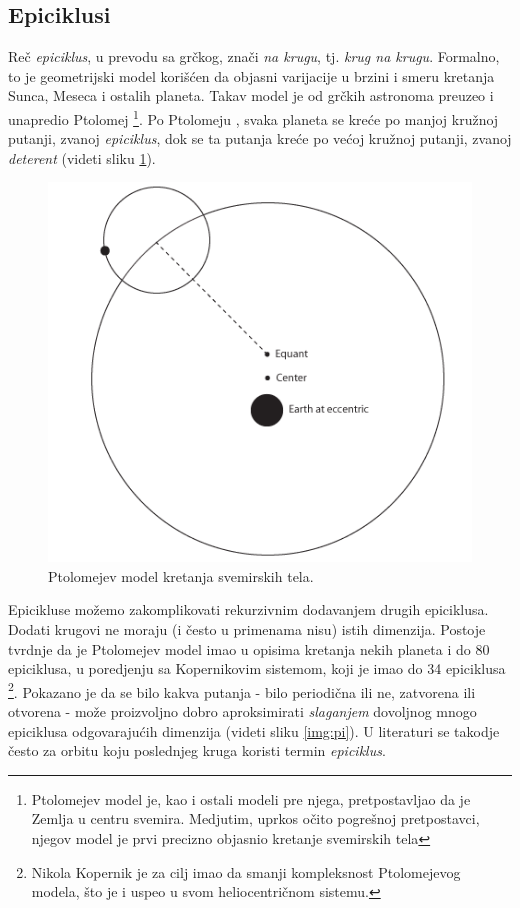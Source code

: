 \subsection{Epiciklusi}
\label{sec:Epicycles}

Re\v{c} \emph{epiciklus}, u prevodu sa gr\v{c}kog, zna\v{c}i \emph{na krugu}, tj. \emph{krug na krugu}. Formalno, to je geometrijski model kori\v{s}\'c{}en da objasni varijacije u brzini i smeru kretanja Sunca, Meseca i ostalih planeta. Takav model je od gr\v{c}kih astronoma preuzeo i unapredio Ptolomej \footnote{Ptolomejev model je, kao i ostali modeli pre njega, pretpostavljao da je Zemlja u centru svemira. Medjutim, uprkos o\v{c}ito pogre\v{s}noj pretpostavci, njegov model je prvi precizno objasnio kretanje svemirskih tela}. Po Ptolomeju \cite{PtolemaicModel}, svaka planeta se kre\'c{}e po manjoj kru\v{z}noj putanji, zvanoj \emph{epiciklus}, dok se ta putanja kre\'c{}e po ve\'c{}oj kru\v{z}noj putanji, zvanoj \emph{deterent} (videti sliku \ref{img:PtolemaicModel}). 

\begin{figure}
    \centering
    \includegraphics[scale=0.5]{images/ptolomaic_model.PNG}
    \caption{Ptolomejev model kretanja svemirskih tela.}
    \label{img:PtolemaicModel}
\end{figure}

Epicikluse mo\v{z}emo zakomplikovati rekurzivnim dodavanjem drugih epiciklusa. Dodati krugovi ne moraju (i \v{c}esto u primenama nisu) istih dimenzija. Postoje tvrdnje da je Ptolomejev model imao u opisima kretanja nekih planeta i do 80 epiciklusa, u poredjenju sa Kopernikovim sistemom, koji je imao do 34 epiciklusa \footnote{Nikola Kopernik je za cilj imao da smanji kompleksnost Ptolomejevog modela, \v{s}to je i uspeo u svom heliocentri\v{c}nom sistemu.}. Pokazano je da se bilo kakva putanja - bilo periodi\v{c}na ili ne, zatvorena ili otvorena - mo\v{z}e proizvoljno dobro aproksimirati \emph{slaganjem} dovoljnog mnogo epiciklusa odgovaraju\'c{}ih dimenzija (videti sliku \ref{img:pi}). U literaturi se takodje \v{c}esto za orbitu koju poslednjeg kruga koristi termin \emph{epiciklus}.


